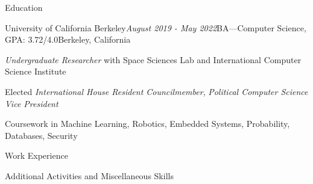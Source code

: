 \documentclass{resume} %
\begin{document}

\begin{rSection}{Education}
\begin{rSubsection}{University of California Berkeley}{\em August 2019 - May 2022}{BA---Computer Science, GPA: 3.72/4.0}{Berkeley, California}
\item \textit{Undergraduate Researcher} with Space Sciences Lab and International Computer Science Institute
\item Elected \textit{International House Resident Councilmember}, \textit{Political Computer Science Vice President}
\item Coursework in Machine Learning, Robotics, Embedded Systems, Probability, Databases, Security
\end{rSubsection}
\end{rSection}
\begin{rSection}{Work Experience}



% 

%
%
\end{rSection}
\begin{rSection}{Additional Activities and Miscellaneous Skills}

\end{rSection}
\end{document}
